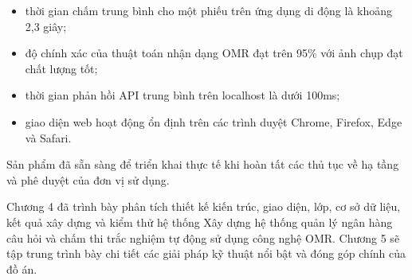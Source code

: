 ﻿\documentclass[../DoAn.tex]{subfiles}
\begin{document}
\begin{itemize}
    \item thời gian chấm trung bình cho một phiếu trên ứng dụng di động là khoảng 2,3 giây;
    \item độ chính xác của thuật toán nhận dạng OMR đạt trên 95\% với ảnh chụp đạt chất lượng tốt;
    \item thời gian phản hồi API trung bình trên localhost là dưới 100ms;
    \item giao diện web hoạt động ổn định trên các trình duyệt Chrome, Firefox, Edge và Safari.
\end{itemize}

Sản phẩm đã sẵn sàng để triển khai thực tế khi hoàn tất các thủ tục về hạ tầng và phê duyệt của đơn vị sử dụng.

Chương 4 đã trình bày phân tích thiết kế kiến trúc, giao diện, lớp, cơ sở dữ liệu, kết quả xây dựng và kiểm thử hệ thống Xây dựng hệ thống quản lý ngân hàng câu hỏi và chấm thi trắc nghiệm tự động sử dụng công nghệ OMR. Chương 5 sẽ tập trung trình bày chi tiết các giải pháp kỹ thuật nổi bật và đóng góp chính của đồ án.
\end{document}

